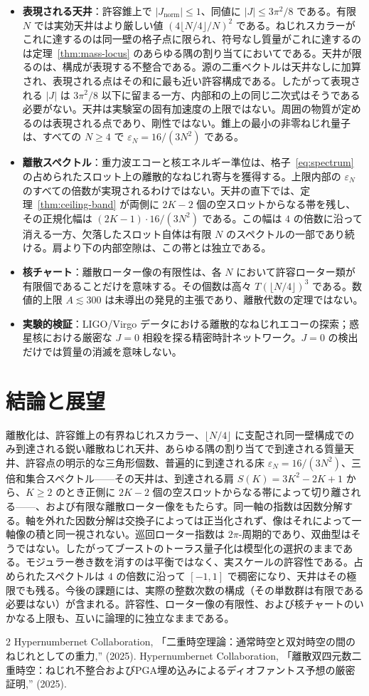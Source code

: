 \documentclass[a4paper]{article}
\theoremstyle{definition}
\newcommand{\Jnorm}{J_{\mathrm{norm}}}
\begin{document}
\begin{itemize}
  \item \textbf{表現される天井}：許容錐上で $|\Jnorm|\le 1$、同値に $|J|\le 3\pi^2/8$ である。有限 $N$ では実効天井はより厳しい値 $(4\lfloor N/4\rfloor/N)^2$ である。ねじれスカラーがこれに達するのは同一壁の格子点に限られ、符号なし質量がこれに達するのは定理~\ref{thm:mass-locus} のあらゆる隅の割り当てにおいてである。天井が限るのは、構成が表現する不整合である。源の二重ベクトルは天井なしに加算され、表現される点はその和に最も近い許容構成である。したがって表現される $|J|$ は $3\pi^2/8$ 以下に留まる一方、内部和の上の同じ二次式はそうである必要がない。天井は実験室の固有加速度の上限ではない。周囲の物質が定めるのは表現される点であり、剛性ではない。錐上の最小の非零ねじれ量子は、すべての $N\geq 4$ で $\varepsilon_N=16/(3N^2)$ である。
  \item \textbf{離散スペクトル}：重力波エコーと核エネルギー準位は、格子~\eqref{eq:spectrum} の占められたスロット上の離散的なねじれ寄与を獲得する。上限内部の $\varepsilon_N$ のすべての倍数が実現されるわけではない。天井の直下では、定理~\ref{thm:ceiling-band} が両側に $2K-2$ 個の空スロットからなる帯を残し、その正規化幅は $(2K-1)\cdot 16/(3N^2)$ である。この幅は $4$ の倍数に沿って消える一方、欠落したスロット自体は有限 $N$ のスペクトルの一部であり続ける。肩より下の内部空隙は、この帯とは独立である。
  \item \textbf{核チャート}：離散ローター像の有限性は、各 $N$ において許容ローター類が有限個であることだけを意味する。その個数は高々 $T(\lfloor N/4\rfloor)^3$ である。数値的上限 $A\lesssim 300$ は未導出の発見的主張であり、離散代数の定理ではない。
  \item \textbf{実験的検証}：LIGO/Virgo データにおける離散的なねじれエコーの探索；惑星核における厳密な $J=0$ 相殺を探る精密時計ネットワーク。$J=0$ の検出だけでは質量の消滅を意味しない。
\end{itemize}

\section{結論と展望}
\label{sec:conclusions}

離散化は、許容錐上の有界ねじれスカラー、$\lfloor N/4\rfloor$ に支配され同一壁構成でのみ到達される鋭い離散ねじれ天井、あらゆる隅の割り当てで到達される質量天井、許容点の明示的な三角形個数、普遍的に到達される床 $\varepsilon_N=16/(3N^2)$、三倍和集合スペクトル——その天井は、到達される肩 $S(K)=3K^2-2K+1$ から、$K\geq 2$ のとき正側に $2K-2$ 個の空スロットからなる帯によって切り離される——、および有限な離散ローター像をもたらす。同一軸の指数は因数分解する。軸を外れた因数分解は交換子によっては正当化されず、像はそれによって一軸像の積と同一視されない。巡回ローター指数は $2\pi$-周期的であり、双曲型はそうではない。したがってブーストのトーラス量子化は模型化の選択のままである。モジュラー巻き数を消すのは平衡ではなく、実スケールの許容性である。占められたスペクトルは $4$ の倍数に沿って $[-1,1]$ で稠密になり、天井はその極限でも残る。今後の課題には、実際の整数次数の構成（その単数群は有限である必要はない）が含まれる。許容性、ローター像の有限性、および核チャートのいかなる上限も、互いに論理的に独立なままである。


\begin{thebibliography}{2}
Hypernumbernet Collaboration,
「二重時空理論：通常時空と双対時空の間のねじれとしての重力,''
(2025).
Hypernumbernet Collaboration,
「離散双四元数二重時空：ねじれ不整合およびPGA埋め込みによるディオファントス予想の厳密証明,''
(2025).
\end{thebibliography}
\end{document}
